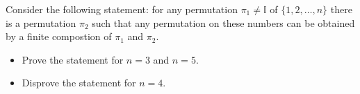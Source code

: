 Consider the following statement: for any permutation \(\pi_1\not=\mathbb{I}\) of \(\{1,2,\dots,n\}\) there is a permutation \(\pi_2\) such that any permutation on these numbers can be obtained by a finite compostion of \(\pi_1\) and \(\pi_2\).
\begin{itemize}

\item[(a)] Prove the statement for \(n=3\) and \(n=5\).
\item[(b)] Disprove the statement for \(n=4\).
\end{itemize}
